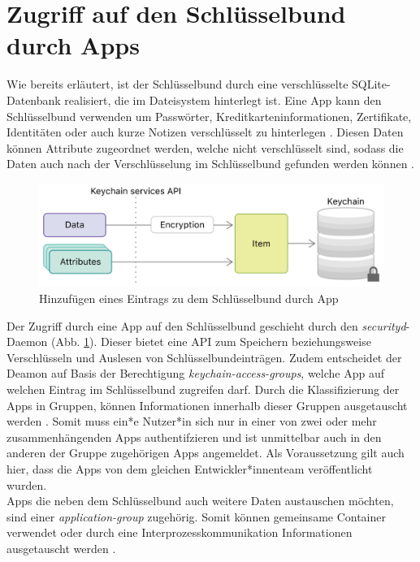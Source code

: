 \section{Zugriff auf den Schlüsselbund durch Apps}

Wie bereits erläutert, ist der Schlüsselbund durch eine verschlüsselte SQLite-Datenbank realisiert, die im Dateisystem hinterlegt ist. Eine App kann den Schlüsselbund verwenden um Passwörter, Kreditkarteninformationen, Zertifikate, Identitäten oder auch kurze Notizen verschlüsselt zu hinterlegen \cite{apple2020keychain_services}.
Diesen Daten können Attribute zugeordnet werden, welche nicht verschlüsselt sind, sodass die Daten auch nach der Verschlüsselung im Schlüsselbund gefunden werden können \cite{apple2020keychain_items}. 

\begin{figure}[h]
	\centering
  		\includegraphics[width=1\textwidth]{../images/keychain-api-example}
		\caption{Hinzufügen eines Eintrags zu dem Schlüsselbund durch App \cite{apple2020keychain_items}}
		\label{fig:add-entry-to-keychain}
\end{figure}

Der Zugriff durch eine App auf den Schlüsselbund geschieht durch den \textit{securityd}-Daemon (Abb. \ref{fig:add-entry-to-keychain}). Dieser bietet eine API zum Speichern beziehungsweise Verschlüsseln und Auslesen von Schlüsselbundeinträgen. Zudem  entscheidet der Deamon auf Basis der Berechtigung \textit{keychain-access-groups}, welche App auf welchen Eintrag im Schlüsselbund zugreifen darf. Durch die Klassifizierung der Apps in Gruppen, können Informationen innerhalb dieser Gruppen ausgetauscht werden \cite{apple2020keychain_item_groups}. Somit muss ein*e Nutzer*in sich nur in einer von zwei oder mehr zusammenhängenden Apps authentifzieren und ist unmittelbar auch in den anderen der Gruppe zugehörigen Apps angemeldet. Als Voraussetzung gilt auch hier, dass die Apps von dem gleichen Entwickler*innenteam veröffentlicht wurden. \\
Apps die neben dem Schlüsselbund auch weitere Daten austauschen möchten, sind einer \textit{application-group} zugehörig.  Somit können gemeinsame Container verwendet oder durch eine Interprozesskommunikation Informationen ausgetauscht werden \cite{apple2020keychain_application_groups}. 

